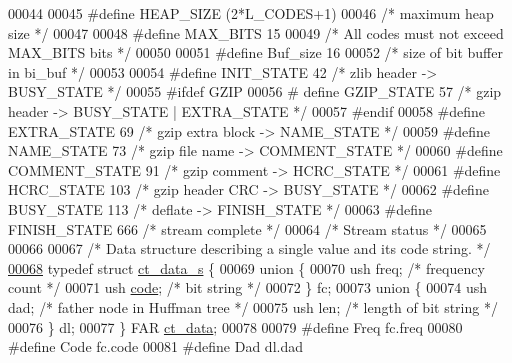 \begin{DoxyCode}
00044 
00045 \textcolor{preprocessor}{#define HEAP\_SIZE (2*L\_CODES+1)}
00046 \textcolor{comment}{/* maximum heap size */}
00047 
00048 \textcolor{preprocessor}{#define MAX\_BITS 15}
00049 \textcolor{comment}{/* All codes must not exceed MAX\_BITS bits */}
00050 
00051 \textcolor{preprocessor}{#define Buf\_size 16}
00052 \textcolor{comment}{/* size of bit buffer in bi\_buf */}
00053 
00054 \textcolor{preprocessor}{#define INIT\_STATE    42    }\textcolor{comment}{/* zlib header -> BUSY\_STATE */}\textcolor{preprocessor}{}
00055 \textcolor{preprocessor}{#ifdef GZIP}
00056 \textcolor{preprocessor}{#  define GZIP\_STATE  57    }\textcolor{comment}{/* gzip header -> BUSY\_STATE | EXTRA\_STATE */}\textcolor{preprocessor}{}
00057 \textcolor{preprocessor}{#endif}
00058 \textcolor{preprocessor}{#define EXTRA\_STATE   69    }\textcolor{comment}{/* gzip extra block -> NAME\_STATE */}\textcolor{preprocessor}{}
00059 \textcolor{preprocessor}{#define NAME\_STATE    73    }\textcolor{comment}{/* gzip file name -> COMMENT\_STATE */}\textcolor{preprocessor}{}
00060 \textcolor{preprocessor}{#define COMMENT\_STATE 91    }\textcolor{comment}{/* gzip comment -> HCRC\_STATE */}\textcolor{preprocessor}{}
00061 \textcolor{preprocessor}{#define HCRC\_STATE   103    }\textcolor{comment}{/* gzip header CRC -> BUSY\_STATE */}\textcolor{preprocessor}{}
00062 \textcolor{preprocessor}{#define BUSY\_STATE   113    }\textcolor{comment}{/* deflate -> FINISH\_STATE */}\textcolor{preprocessor}{}
00063 \textcolor{preprocessor}{#define FINISH\_STATE 666    }\textcolor{comment}{/* stream complete */}\textcolor{preprocessor}{}
00064 \textcolor{comment}{/* Stream status */}
00065 
00066 
00067 \textcolor{comment}{/* Data structure describing a single value and its code string. */}
\hyperlink{structct__data__s}{00068} \textcolor{keyword}{typedef} \textcolor{keyword}{struct }\hyperlink{structct__data__s}{ct\_data\_s} \{
00069     \textcolor{keyword}{union }\{
00070         ush  freq;       \textcolor{comment}{/* frequency count */}
00071         ush  \hyperlink{structcode}{code};       \textcolor{comment}{/* bit string */}
00072     \} fc;
00073     \textcolor{keyword}{union }\{
00074         ush  dad;        \textcolor{comment}{/* father node in Huffman tree */}
00075         ush  len;        \textcolor{comment}{/* length of bit string */}
00076     \} dl;
00077 \} FAR \hyperlink{structct__data__s}{ct\_data};
00078 
00079 \textcolor{preprocessor}{#define Freq fc.freq}
00080 \textcolor{preprocessor}{#define Code fc.code}
00081 \textcolor{preprocessor}{#define Dad  dl.dad}

\end{DoxyCode}
